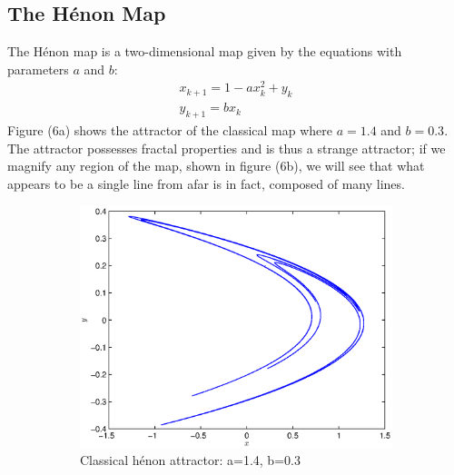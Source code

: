 \documentclass[a4paper]{article}
\begin{document}
\subsection{The H{\'e}non Map}
The H{\'e}non map is a two-dimensional map given by the equations with parameters $ a $ and $ b $:
\begin{gather*}
x_{k+1} = 1-ax_k^2+y_k
\\y_{k+1}=bx_k
\end{gather*}
Figure (6a) shows the attractor of the classical map where $ a=1.4 $ and $ b=0.3 $. The attractor possesses fractal properties and is thus a strange attractor; if we magnify any region of the map, shown in figure (6b), we will see that what appears to be a single line from afar is in fact, composed of many lines. 

\begin{figure}[h]
    \centering
    \begin{subfigure}[b]{0.45\textwidth}
        \includegraphics[width=\textwidth]{classicalhenon}
        \caption{Classical h{\'e}non attractor: a=1.4, b=0.3}
        \label{fig:tiger}
    \end{subfigure}
    ~ %
    \begin{subfigure}[b]{0.45\textwidth}

\end{subfigure}
\end{figure}
\end{document}
